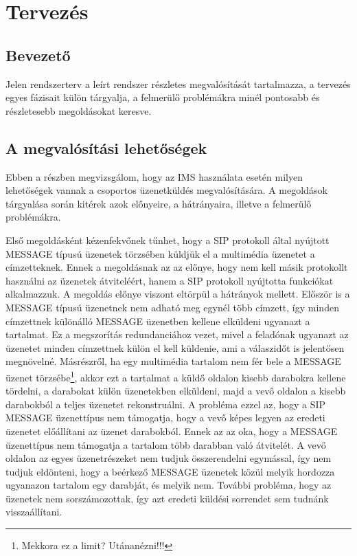 

\section{Tervezés}

\subsection{Bevezető}

Jelen rendszerterv a leírt rendszer részletes megvalósítását
tartalmazza, a tervezés egyes fázisait külön tárgyalja, a felmerülő
problémákra minél pontosabb és részletesebb megoldásokat keresve.

\subsection{A megvalósítási lehetőségek}

Ebben a részben megvizsgálom, hogy az IMS használata esetén milyen lehetőségek vannak a csoportos üzenetküldés megvalósítására. A megoldások tárgyalása során kitérek azok előnyeire, a hátrányaira, illetve a felmerülő problémákra.

Első megoldásként kézenfekvőnek tűnhet, hogy a SIP protokoll által nyújtott MESSAGE típusú üzenetek törzsében küldjük el a multimédia üzenetet a címzetteknek. Ennek a megoldásnak az az előnye, hogy nem kell másik protokollt használni az üzenetek átviteléért, hanem a SIP protokoll nyújtotta funkciókat alkalmazzuk. A megoldás előnye viszont eltörpül a hátrányok mellett. Először is a MESSAGE típusú üzenetnek nem adható meg egynél több címzett, így minden címzettnek különálló MESSAGE üzenetben kellene elküldeni ugyanazt a tartalmat. Ez a megszorítás redundanciához vezet, mivel a feladónak ugyanazt az üzenetet minden címzettnek külön el kell küldenie, ami a válaszidőt is jelentősen megnövelné. Másrészről, ha egy multimédia tartalom nem fér bele a MESSAGE üzenet törzsébe\footnote{Mekkora ez a limit? Utánanézni!!!}, akkor ezt a tartalmat a küldő oldalon kisebb darabokra kellene tördelni, a darabokat külön üzenetekben elküldeni, majd a vevő oldalon a kisebb darabokból a teljes üzenetet rekonstruálni. A probléma ezzel az, hogy a SIP MESSAGE üzenettípus nem támogatja, hogy a vevő képes legyen az eredeti üzenetet előállítani az üzenet darabokból. Ennek az az oka, hogy a MESSAGE üzenettípus nem támogatja a tartalom több darabban való átvitelét. A vevő oldalon az egyes üzenetrészeket nem tudjuk összerendelni egymással, így nem tudjuk eldönteni, hogy a beérkező MESSAGE üzenetek közül melyik hordozza ugyanazon tartalom egy darabját, és melyik nem. További probléma, hogy az üzenetek nem sorszámozottak, így azt eredeti küldési sorrendet sem tudnánk visszaállítani.



